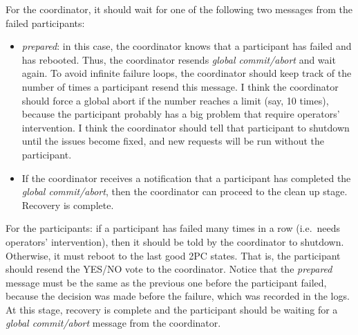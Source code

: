 For the coordinator, it should wait for one of the following two messages from the failed participants:
\begin{itemize}
\item
\emph{prepared}:
in this case, the coordinator knows that a participant has failed and has rebooted.
Thus, the coordinator resends \emph{global commit/abort} and wait again.
To avoid infinite failure loops, the coordinator should keep track of the number of times a participant resend this message.
I think the coordinator should force a global abort if the number reaches a limit (say, 10 times), because the participant probably has a big problem that require operators' intervention.
I think the coordinator should tell that participant to shutdown until the issues become fixed, and new requests will be run without the participant.
\item
If the coordinator receives a notification that a participant has completed the \emph{global commit/abort}, then the coordinator can proceed to the clean up stage.
Recovery is complete.
\end{itemize}

For the participants:
if a participant has failed many times in a row (i.e.\ needs operators' intervention), then it should be told by the coordinator to shutdown.
Otherwise, it must reboot to the last good 2PC states.
That is, the participant should resend the YES/NO vote to the coordinator.
Notice that the \emph{prepared} message must be the same as the previous one before the participant failed, because the decision was made before the failure, which was recorded in the logs.
At this stage, recovery is complete and the participant should be waiting for a \emph{global commit/abort} message from the coordinator.
